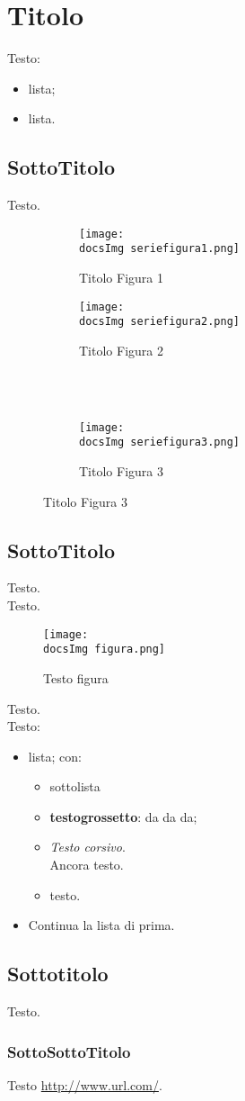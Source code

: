 \section{Titolo}{
	
	Testo:
	\begin{itemize}\itemsep1pt
		\item lista;
		\item lista.
	\end{itemize} 
	
	\subsection{SottoTitolo}{
		Testo.
		
		\begin{figure}[ht]
			\begin{subfigure}[b]{0.5\textwidth}
				\texttt{[image: \\docsImg seriefigura1.png]}
				\caption{Titolo Figura 1}
				\label{Titolo Figura 1}
			\end{subfigure}
			\begin{subfigure}[b]{0.5\textwidth}
				\texttt{[image: \\docsImg seriefigura2.png]}
				\caption{Titolo Figura 2}
				\label{Titolo Figura 2}
			\end{subfigure}
			\\
			\\
			\begin{subfigure}[b]{0.5\textwidth}
				\texttt{[image: \\docsImg seriefigura3.png]}
				\caption{Titolo Figura 3}
				\label{Titolo Figura 3}
			\end{subfigure}
		\end{figure}
	}
	\subsection{SottoTitolo}{
		Testo.
	\\
		Testo.
		\begin{figure}[ht]
			\centering
			\texttt{[image: \\docsImg figura.png]}
			\caption{Testo figura}
			\label{Testo figura}
		\end{figure}
		
		Testo.
		\\
		Testo:
		\begin{itemize}\itemsep1pt
			\item lista; con:
			\begin{itemize}\itemsep1pt
				\item sottolista
				\item \textbf{testogrossetto}: da da da;
				\item \textit{Testo corsivo}.\\ 
				Ancora testo.
				\item testo.
			\end{itemize}
			\item Continua la lista di prima.
		\end{itemize}
		}
	\subsection{Sottotitolo}{
		Testo.
		\subsubsection{SottoSottoTitolo}{
			Testo \url{http://www.url.com/}.
		}
	}
}
